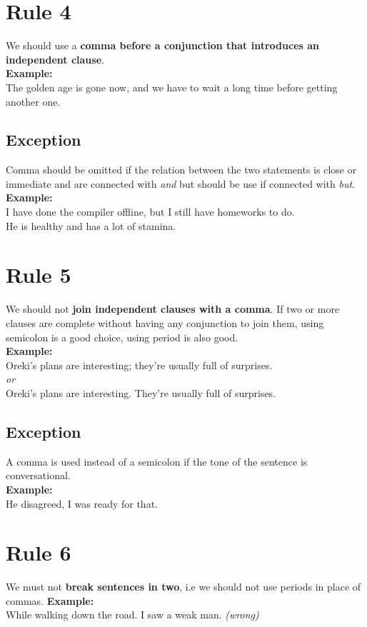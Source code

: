 \documentclass{report}
\begin{document}
\section{Rule 4}
We should use a \textbf{comma before a conjunction that introduces an independent clause}.\\ \textbf{Example:}\\
The golden age is gone now, and we have to wait a long time before getting another one.
\subsection{Exception}
Comma should be omitted if the relation between the two statements is close or immediate and are connected with \textit{and} but should be use if connected with \textit{but}.\\
\textbf{Example:}\\
I have done the compiler offline, but I still have homeworks to do.\\
He is healthy and has a lot of stamina.
\section{Rule 5}
We should not \textbf{join independent clauses with a comma}. If two or more clauses are complete without having any conjunction to join them, using semicolon is a good choice, using period is also good.\\
\textbf{Example:}\\
Oreki's plans are interesting; they're usually full of surprises.\\
\textit{or}\\
Oreki's plans are interesting. They're usually full of surprises.
\subsection{Exception}
A comma is used instead of a semicolon if the tone of the sentence is conversational.\\ \textbf{Example:}\\
He disagreed, I was ready for that.

\section{Rule 6}
We must not \textbf{break sentences in two}, i.e we should not use periods in place of commas.
\textbf{Example:}\\
While walking down the road. I saw a weak man. \textit{(wrong)}
\end{document}
